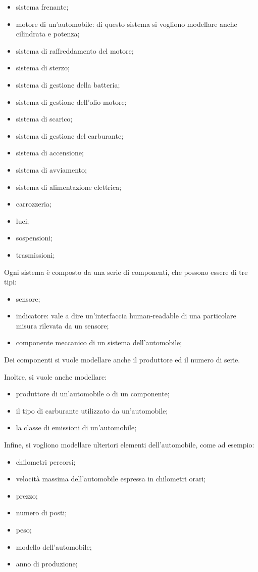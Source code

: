 \begin{itemize}
    \item sistema frenante;
    \item motore di un'automobile: di questo sistema si vogliono modellare anche cilindrata e potenza;
    \item sistema di raffreddamento del motore;
    \item sistema di sterzo;
    \item sistema di gestione della batteria;
    \item sistema di gestione dell'olio motore;
    \item sistema di scarico;
    \item sistema di gestione del carburante;
    \item sistema di accensione;
    \item sistema di avviamento;
    \item sistema di alimentazione elettrica;
    \item carrozzeria;
    \item luci;
    \item sospensioni;
    \item trasmissioni;
\end{itemize}

Ogni sistema è composto da una serie di componenti, che possono essere di tre tipi:
\begin{itemize}
    \item sensore;
    \item indicatore: vale a dire un'interfaccia human-readable di una particolare misura rilevata da un sensore;
    \item componente meccanico di un sistema dell'automobile;
\end{itemize}

Dei componenti si vuole modellare anche il produttore ed il numero di serie.

Inoltre, si vuole anche modellare:

\begin{itemize}
    \item produttore di un'automobile o di un componente;
    \item il tipo di carburante utilizzato da un'automobile;
    \item la classe di emissioni di un'automobile;
\end{itemize}

Infine, si vogliono modellare ulteriori elementi dell'automobile, come ad esempio:

\begin{itemize}
    \item chilometri percorsi;
    \item velocità massima dell'automobile espressa in chilometri orari;
    \item prezzo;
    \item numero di posti;
    \item peso;
    \item modello dell'automobile;
    \item anno di produzione;
\end{itemize}